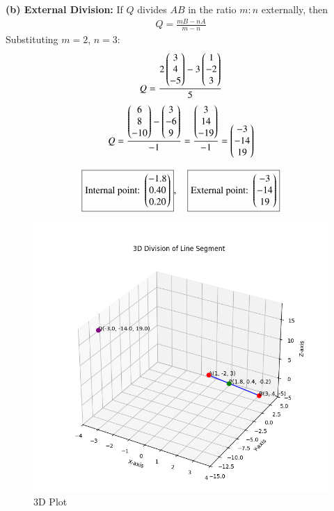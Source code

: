 \documentclass[12pt]{article}
\begin{document}
\textbf{(b) External Division:}  
If $Q$ divides $AB$ in the ratio $m:n$ externally, then
\begin{align}
Q = \frac{mB-nA}{m-n}
\end{align}
Substituting $m=2$, $n=3$:
\begin{align}
Q = \frac{2\begin{pmatrix}3 \\ 4 \\ -5\end{pmatrix} - 3\begin{pmatrix}1 \\ -2 \\ 3\end{pmatrix}}{5}
\end{align}
\begin{align}
Q = \frac{\begin{pmatrix}6 \\ 8 \\ -10\end{pmatrix} - \begin{pmatrix}3 \\ -6 \\ 9\end{pmatrix}}{-1}
= \frac{\begin{pmatrix}3 \\ 14 \\ -19\end{pmatrix}}{-1}
= \begin{pmatrix}-3 \\ -14 \\ 19\end{pmatrix}
\end{align}

\begin{align}
\boxed{\text{Internal point: } \begin{pmatrix}-1.8 \\ 0.40 \\ 0.20\end{pmatrix}}, \quad
\boxed{\text{External point: } \begin{pmatrix}-3 \\ -14 \\ 19\end{pmatrix}}
\end{align}
\begin{figure}[H]
\centering
\includegraphics[width = 1.1\columnwidth]{figs/fig1.png}
\caption{3D Plot}
\label{fig1:plot}
\end{figure}
\end{document}

